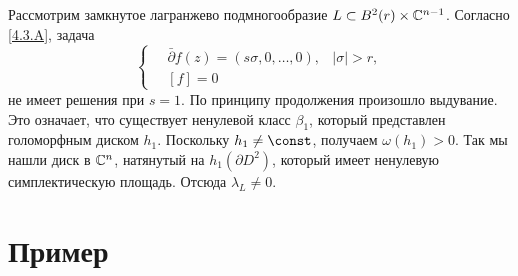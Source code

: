 Рассмотрим замкнутое лагранжево подмногообразие $L \subset B^2 (r) \times \mathbb{C}^{n-1}$.
Согласно \ref{4.3.A}, задача
\[
\begin{cases}
\quad\bar\partial f(z)=(s\sigma,0,\dots,0),&|\sigma|>r,
\\
\quad[f]=0
\end{cases}
\]
не имеет решения при $s = 1$.
По принципу продолжения произошло выдувание.
Это означает, что существует ненулевой класс $\beta_1$, который представлен голоморфным диском $h_1$.
Поскольку $h_1 \z\ne \const$, получаем $\omega (h_1)> 0$.
Так мы нашли диск в $\mathbb{C}^n$, натянутый на $h_1 (\partial D^2)$, который имеет ненулевую симплектическую площадь.
Отсюда $\lambda_L \ne 0$.
\qeds

\section{Пример}\label{sec:4.4}

